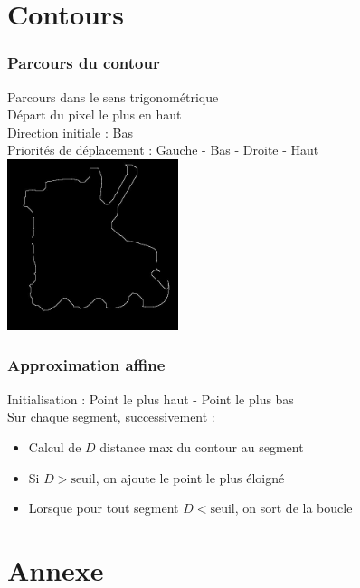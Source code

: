 \documentclass[french]{beamer}
\begin{document}
\section{Contours}

\begin{frame}
	\frametitle{Parcours du contour}
	Parcours dans le sens trigonométrique\\
	Départ du pixel le plus en haut\\
	Direction initiale : Bas \\
	Priorités de déplacement : Gauche - Bas - Droite - Haut\\
	\bigskip
	\includegraphics[width=5cm]{images/roller_contour.jpg}
\end{frame}

\begin{frame}
	\frametitle{Approximation affine}
	Initialisation : Point le plus haut - Point le plus bas\\
	Sur chaque segment, successivement :
	\begin{itemize}
		\item Calcul de $D$ distance max du contour au segment
		\item Si $D > \text{seuil}$, on ajoute le point le plus éloigné
		\item Lorsque pour tout segment $D < \text{seuil}$, on sort de la boucle
	\end{itemize}
\end{frame}

\section{Annexe}
\end{document}

